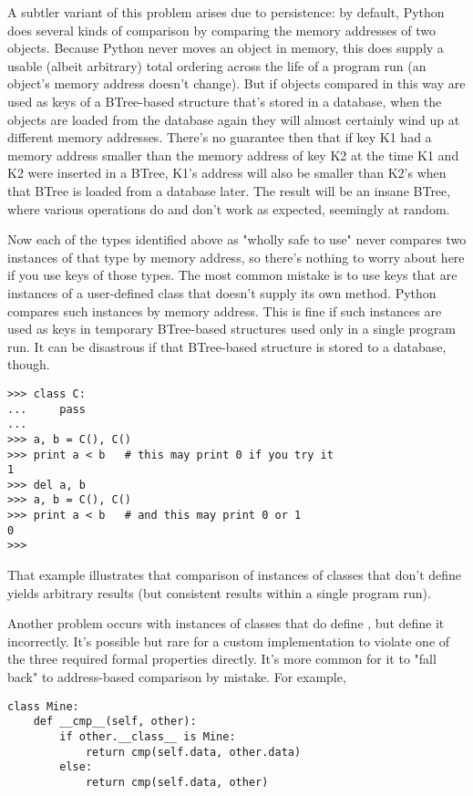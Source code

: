A subtler variant of this problem arises due to persistence:  by default,
Python does several kinds of comparison by comparing the memory
addresses of two objects.  Because Python never moves an object in memory,
this does supply a usable (albeit arbitrary) total ordering across the
life of a program run (an object's memory address doesn't change).  But
if objects compared in this way are used as keys of a BTree-based
structure that's stored in a database, when the objects are loaded from
the database again they will almost certainly wind up at different
memory addresses.  There's no guarantee then that if key K1 had a memory
address smaller than the memory address of key K2 at the time K1 and
K2 were inserted in a BTree, K1's address will also be smaller than
K2's when that BTree is loaded from a database later.  The result will
be an insane BTree, where various operations do and don't work as
expected, seemingly at random.

Now each of the types identified above as "wholly safe to use" never
compares two instances of that type by memory address, so there's
nothing to worry about here if you use keys of those types.  The most
common mistake is to use keys that are instances of a user-defined class
that doesn't supply its own  method.  Python compares
such instances by memory address.  This is fine if such instances are
used as keys in temporary BTree-based structures used only in a single
program run.  It can be disastrous if that BTree-based structure is
stored to a database, though.

\begin{verbatim}
>>> class C:
...     pass
...
>>> a, b = C(), C()
>>> print a < b   # this may print 0 if you try it
1
>>> del a, b
>>> a, b = C(), C()
>>> print a < b   # and this may print 0 or 1
0
>>>
\end{verbatim}

That example illustrates that comparison of instances of classes that
don't define  yields arbitrary results (but consistent
results within a single program run).

Another problem occurs with instances of classes that do define
, but define it incorrectly.  It's possible but
rare for a custom  implementation to violate one
of the three required formal properties directly.  It's more common for
it to "fall back" to address-based comparison by mistake.
For example,

\begin{verbatim}
class Mine:
    def __cmp__(self, other):
        if other.__class__ is Mine:
            return cmp(self.data, other.data)
        else:
            return cmp(self.data, other)
\end{verbatim}

